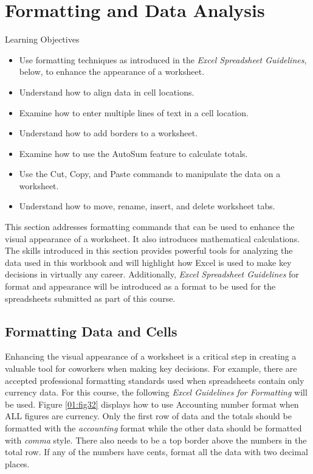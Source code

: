 \section{Formatting and Data Analysis}

\begin{center}
	\begin{objbox}{Learning Objectives}
		\begin{itemize}
			\setlength{\itemsep}{0pt}
			\setlength{\parskip}{0pt}
			\setlength{\parsep}{0pt}
			
			\item Use formatting techniques as introduced in the \textit{Excel Spreadsheet Guidelines}, below, to enhance the appearance of a worksheet.
			\item Understand how to align data in cell locations.
			\item Examine how to enter multiple lines of text in a cell location.
			\item Understand how to add borders to a worksheet.
			\item Examine how to use the AutoSum feature to calculate totals.
			\item Use the Cut, Copy, and Paste commands to manipulate the data on a worksheet.
			\item Understand how to move, rename, insert, and delete worksheet tabs.
		\end{itemize}
	\end{objbox}
\end{center}

This section addresses formatting commands that can be used to enhance the visual appearance of a worksheet. It also introduces mathematical calculations. The skills introduced in this section provides powerful tools for analyzing the data used in this workbook and will highlight how Excel is used to make key decisions in virtually any career. Additionally, \textit{Excel Spreadsheet Guidelines} for format and appearance will be introduced as a format to be used for the spreadsheets submitted as part of this course.

\subsection{Formatting Data and Cells}

Enhancing the visual appearance of a worksheet is a critical step in creating a valuable tool for coworkers when making key decisions. For example, there are accepted professional formatting standards used when spreadsheets contain only currency data. For this course, the following \textit{Excel Guidelines for Formatting} will be used. Figure \ref{01:fig32} displays how to use Accounting number format when ALL figures are currency. Only the first row of data and the totals should be formatted with the \textit{accounting} format while the other data should be formatted with \textit{comma} style. There also needs to be a top border above the numbers in the total row. If any of the numbers have cents, format all the data with two decimal places.

